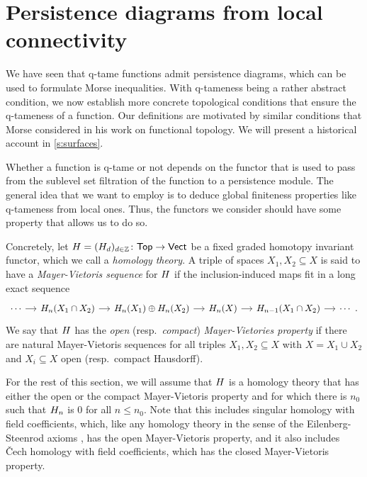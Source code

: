 
\section{Persistence diagrams from local connectivity} \label{s:connectivity}

We have seen that q-tame functions admit persistence diagrams, which can be used to formulate Morse inequalities.
With q-tameness being a rather abstract condition, we now establish more concrete topological conditions that ensure the q-tameness of a function.
Our definitions are motivated by similar conditions that Morse considered in his work on functional topology.
We will present a historical account in \cref{s:surfaces}.

Whether a function is q-tame or not depends on the functor that is used to pass from the sublevel set filtration of the function to a persistence module.
The general idea that we want to employ is to deduce global finiteness properties like q-tameness from local ones.
Thus, the functors we consider should have some property that allows us to do so.

Concretely, let $H = (H_d)_{d \in \mathbb{Z}} \colon \mathsf{Top} \to \mathsf{Vect}$ be a fixed graded homotopy invariant functor, which we call a \emph{homology theory}.
A triple of spaces $X_{1}, X_{2} \subseteq X$ is said to have a \emph{Mayer-Vietoris sequence} for $H$ if the inclusion-induced maps fit in a long exact sequence
\begin{equation*}
\begin{tikzcd}[column sep = small]
\cdots \arrow[r] & \H_{n}(X_{1} \cap X_{2}) \arrow[r] & \H_{n}(X_{1}) \oplus \H_{n}(X_{2}) \arrow[r] & \H_{n}(X) \arrow[r] & \H_{n-1}(X_{1} \cap X_{2}) \arrow[r] & \cdots \ .
\end{tikzcd}
\end{equation*}
We say that $H$ has the \emph{open} (resp.\@\  \emph{compact}) \emph{Mayer-Vietories property} if there are natural Mayer-Vietoris sequences for all triples $X_{1}, X_{2} \subseteq X$ with $X = X_1 \cup X_2$ and $X_i \subseteq X$ open (resp.\@\ compact Hausdorff).

For the rest of this section, we will assume that $H$ is a homology theory that has either the open or the compact Mayer-Vietoris property and for which there is $n_0$ such that $H_{n}$ is 0 for all $n \leq n_0$.
Note that this includes singular homology with field coefficients, which, like any homology theory in the sense of the Eilenberg-Steenrod axioms \cite[Section I]{MR0050886}, has the open Mayer-Vietoris property, and it also includes \v{C}ech homology with field coefficients, which has the closed Mayer-Vietoris property.

